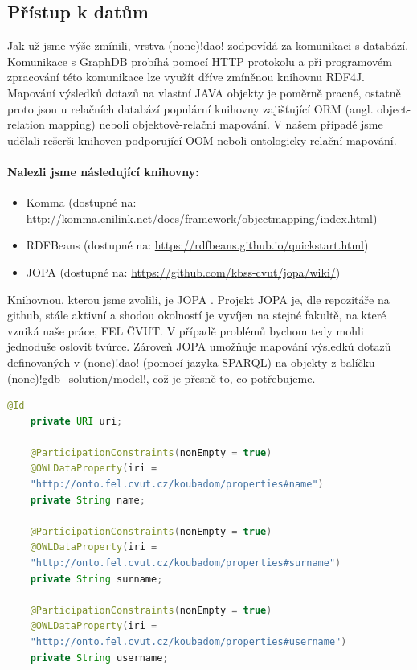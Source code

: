 \subsection{Přístup k datům}
Jak už jsme výše zmínili, vrstva \ctulst(none)!dao! zodpovídá za komunikaci s databází. Komunikace s GraphDB probíhá pomocí HTTP protokolu a při programovém zpracování této komunikace lze využít dříve zmíněnou knihovnu RDF4J. Mapování výsledků dotazů na vlastní JAVA objekty je poměrně pracné, ostatně proto jsou u relačních databází populární knihovny zajišťující ORM (angl. object-relation mapping) neboli objektově-relační mapování. V našem případě jsme udělali rešerši knihoven podporující OOM neboli ontologicky-relační mapování.
\paragraph{Nalezli jsme následující knihovny:}
\begin{itemize}
    \item Komma (dostupné na: \url{http://komma.enilink.net/docs/framework/objectmapping/index.html})
    \item RDFBeans (dostupné na: \url{https://rdfbeans.github.io/quickstart.html})
    \item JOPA (dostupné na: \url{https://github.com/kbss-cvut/jopa/wiki/})
\end{itemize}
Knihovnou, kterou jsme zvolili, je JOPA \cite{JOPA}. Projekt JOPA je, dle repozitáře na github, stále aktivní a shodou okolností je vyvíjen na stejné fakultě, na které vzniká naše práce, FEL ČVUT. V případě problémů bychom tedy mohli jednoduše oslovit tvůrce. Zároveň JOPA umožňuje mapování výsledků dotazů definovaných v \ctulst(none)!dao! (pomocí jazyka SPARQL) na objekty z balíčku \ctulst(none)!gdb_solution/model!, což je přesně to, co potřebujeme.

\begin{lstlisting}[language=JAVA, caption= Příklad definice proměnných polí v entitě PersonGDB za pomoci anotací z knihovny JOPA, captionpos=b]
    @Id
    private URI uri;

    @ParticipationConstraints(nonEmpty = true)
    @OWLDataProperty(iri =
    "http://onto.fel.cvut.cz/koubadom/properties#name")
    private String name;

    @ParticipationConstraints(nonEmpty = true)
    @OWLDataProperty(iri =
    "http://onto.fel.cvut.cz/koubadom/properties#surname")
    private String surname;

    @ParticipationConstraints(nonEmpty = true)
    @OWLDataProperty(iri =
    "http://onto.fel.cvut.cz/koubadom/properties#username")
    private String username;
\end{lstlisting}

